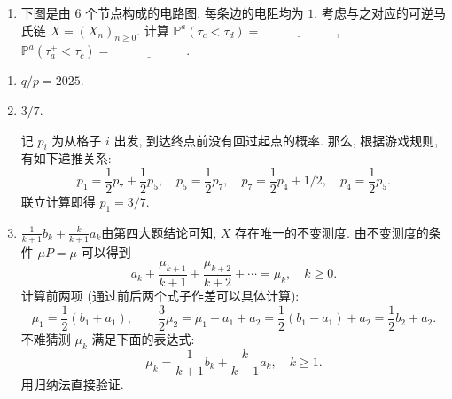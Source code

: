 \begin{enumerate}
\begin{enumerate}[label=(\arabic*)]
        (\textbf{提示:} 记 $b_k:=\sum_{i\geq k}a_i$. 尝试用 $a_k$ 和 $b_k$ 给出表达式.)

        \item 下图是由 $6$ 个节点构成的电路图, 每条边的电阻均为 $1$. 考虑与之对应的可逆马氏链
        $X=(X_n)_{n\geq 0}$. 计算
        $\mathbb P^a(\tau_c<\tau_d)=\underline{\qquad\qquad\qquad}$,
        $\mathbb P^a(\tau_a^+<\tau_c)=\underline{\qquad\qquad\qquad}$.
        \begin{center}  \end{center}
        
    \end{enumerate}

    \begin{proofc}[解答]
        \begin{enumerate}[label=(\arabic*)]
            \item $\boxed{q/p=2025}$.

            \item $\boxed{3/7}$.

            记 $p_i$ 为从格子 $i$ 出发, 到达终点前没有回过起点的概率. 那么, 根据游戏规则,
            有如下递推关系:
            \[
                p_1=\frac12p_7+\frac12p_5,\quad
                p_5=\frac12p_7,\quad
                p_7=\frac12p_4+1/2,\quad
                p_4=\frac12p_5.
            \]
            联立计算即得 $p_1=3/7$.

            \item $\boxed{\frac{1}{k+1}b_k+\frac{k}{k+1}a_k}$由第四大题结论可知, $X$ 存在唯一的不变测度. 由不变测度的条件
            $\mu P=\mu$ 可以得到
            \[
                a_k+\frac{\mu_{k+1}}{k+1}+\frac{\mu_{k+2}}{k+2}+\cdots=\mu_k,\quad k\geq 0.
            \]
            计算前两项 (通过前后两个式子作差可以具体计算):
            \[
                \mu_1=\frac12(b_1+a_1),\qquad
                \frac32\mu_2=\mu_1-a_1+a_2=\frac12(b_1-a_1)+a_2=\frac12b_2+a_2.
            \]
            不难猜测 $\mu_k$ 满足下面的表达式:
            \[
                \mu_k=\frac{1}{k+1}b_k+\frac{k}{k+1}a_k,\quad k\geq 1.
            \]
            用归纳法直接验证.


\end{enumerate}
\end{proofc}
\end{enumerate}
